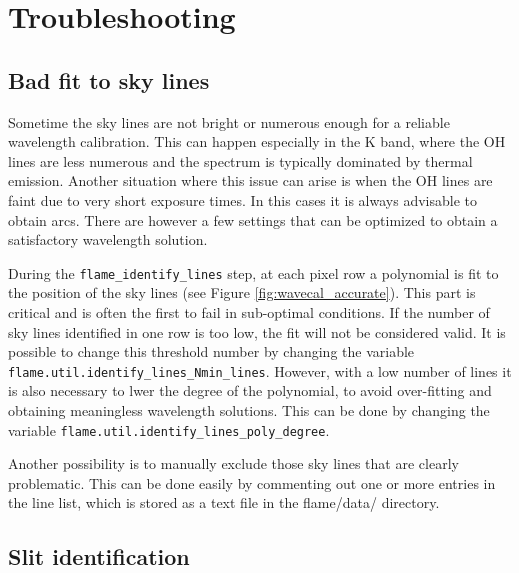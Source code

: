\documentclass[a4paper, notitlepage]{article}
\begin{document}



\section{Troubleshooting}

\subsection{Bad fit to sky lines}

Sometime the sky lines are not bright or numerous enough for a reliable wavelength calibration. This can happen especially in the K band, where the OH lines are less numerous and the spectrum is typically dominated by thermal emission. Another situation where this issue can arise is when the OH lines are faint due to very short exposure times. In this cases it is always advisable to obtain arcs. There are however a few settings that can be optimized to obtain a satisfactory wavelength solution.

During the \texttt{flame\_identify\_lines} step, at each pixel row a polynomial is fit to the position of the sky lines (see Figure \ref{fig:wavecal_accurate}). This part is critical and is often the first to fail in sub-optimal conditions. If the number of sky lines identified in one row is too low, the fit will not be considered valid. It is possible to change this threshold number by changing the variable \texttt{flame.util.identify\_lines\_Nmin\_lines}. However, with a low number of lines it is also necessary to lwer the degree of the polynomial, to avoid over-fitting and obtaining meaningless wavelength solutions. This can be done by changing the variable \texttt{flame.util.identify\_lines\_poly\_degree}.

Another possibility is to manually exclude those sky lines that are clearly problematic. This can be done easily by commenting out one or more entries in the line list, which is stored as a text file in the flame/data/ directory.


\subsection{Slit identification}
\end{document}
